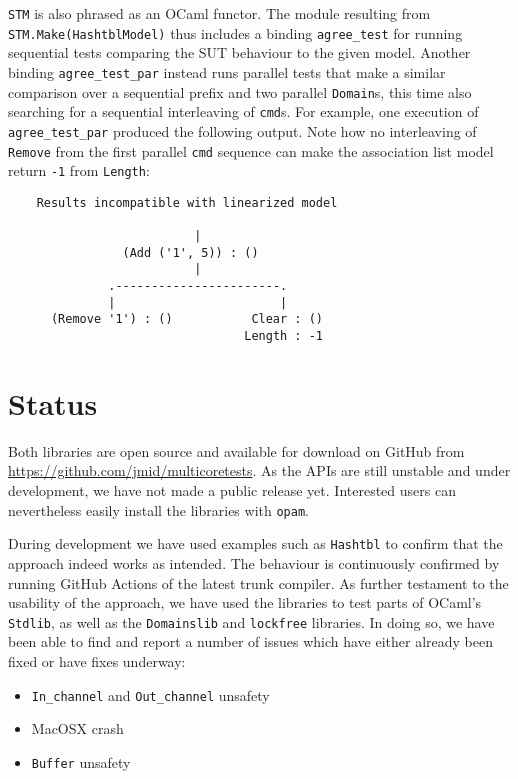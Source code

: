 \documentclass[twocolumn,10pt]{article}
\begin{document}
\texttt{STM} is also phrased as an OCaml functor. The module resulting from
\texttt{STM.Make(HashtblModel)} thus includes a binding
\lstinline|agree_test| for running sequential tests comparing the SUT
behaviour to the given model.
Another binding
\lstinline|agree_test_par| instead runs parallel tests that make a similar
  comparison over a sequential prefix and two parallel \texttt{Domain}s, this
  time also searching for a sequential interleaving of \texttt{cmd}s.
For example, one execution of \lstinline|agree_test_par| produced the following
output. Note how no interleaving of \texttt{Remove} from the first parallel
\texttt{cmd} sequence can make the association list model return \lstinline|-1| from
\texttt{Length}:

\begingroup{}
\begin{lstlisting}
    Results incompatible with linearized model
    
                          |
                (Add ('1', 5)) : ()
                          |
              .-----------------------.
              |                       |
      (Remove '1') : ()           Clear : ()
                                 Length : -1
\end{lstlisting}
\endgroup
\vspace{-1.6em}

\section{Status}

Both libraries are open source and available for download on GitHub
from \url{https://github.com/jmid/multicoretests}.
As the APIs are still unstable and under development, we have not made
a public release yet. Interested users can nevertheless easily install
the libraries with \texttt{opam}.

During development we have used examples such as \texttt{Hashtbl} to
confirm that the approach indeed works as intended. The behaviour is
continuously confirmed by running GitHub Actions of the latest trunk
compiler. As further testament to the usability of the approach, we
have used the libraries to test parts of OCaml's \texttt{Stdlib}, as well as
the \texttt{Domainslib} and \texttt{lockfree} libraries. In doing so, we have been
able to find and report a number of issues which have either already
been fixed or have fixes underway:
\begin{itemize}
  \tightlist
  \item \lstinline|In_channel| and \lstinline|Out_channel|
    unsafety~\cite{AddFailingOut2022,AuditStdlibMutable2022}
  \item MacOSX crash~\cite{SegfaultMacOSXTrunk2022}
  \item \texttt{Buffer} unsafety~\cite{STMCleanup2022,ParallelAccessBuffer2022}
\end{itemize}
\end{document}
